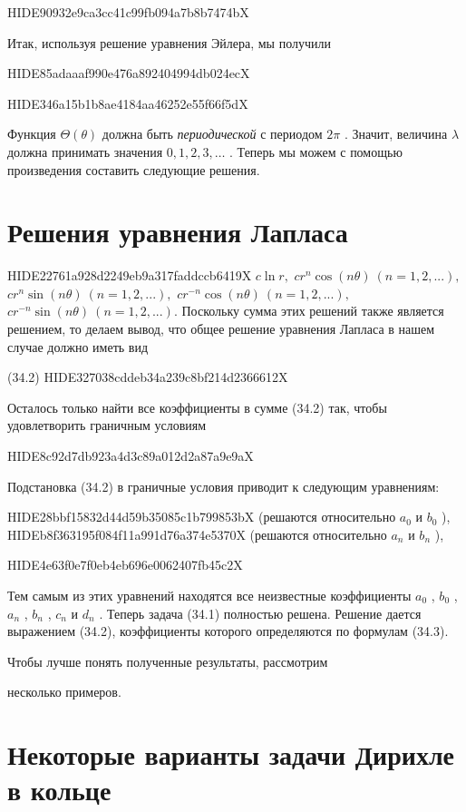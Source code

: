 \documentclass[
  ukrainian,
]{article}
\begin{document}
HIDE90932e9ca3cc41c99fb094a7b8b7474bX

Итак, используя решение уравнения Эйлера, мы получили

HIDE85adaaaf990e476a892404994db024ecX

HIDE346a15b1b8ae4184aa46252e55f66f5dX

Функция \(\Theta(\theta)\) должна быть \emph{периодической} с периодом
\(2\pi\) . Значит, величина \(\lambda\) должна принимать значения
\(0, 1, 2, 3, \ldots\) . Теперь мы можем с помощью произведения
составить следующие решения.

\section{Решения уравнения
Лапласа}\label{ux440ux435ux448ux435ux43dux438ux44f-ux443ux440ux430ux432ux43dux435ux43dux438ux44f-ux43bux430ux43fux43bux430ux441ux430}

HIDE22761a928d2249eb9a317faddccb6419X \(c \ln r,\)
\(cr^n \cos(n\theta) \ (n = 1, 2, ...),\)
\(cr^n \sin(n\theta) \ (n = 1, 2, ...),\)
\(cr^{-n} \cos(n\theta) \ (n = 1, 2, ...),\)
\(cr^{-n} \sin(n\theta) \ (n = 1, 2, ...).\) Поскольку сумма этих
решений также является решением, то делаем вывод, что общее решение
уравнения Лапласа в нашем случае должно иметь вид

(34.2) HIDE327038cddeb34a239c8bf214d2366612X

Осталось только найти все коэффициенты в сумме (34.2) так, чтобы
удовлетворить граничным условиям

HIDE8c92d7db923a4d3c89a012d2a87a9e9aX

Подстановка (34.2) в граничные условия приводит к следующим уравнениям:

HIDE28bbf15832d44d59b35085c1b799853bX (решаются относительно \(a_0\) и
\(b_0\) ), HIDEb8f363195f084f11a991d76a374e5370X (решаются относительно
\(a_n\) и \(b_n\) ),

HIDE4e63f0e7f0eb4eb696e0062407fb45c2X

Тем самым из этих уравнений находятся все неизвестные коэффициенты
\(a_0\) , \(b_0\) , \(a_n\) , \(b_n\) , \(c_n\) и \(d_n\) . Теперь
задача (34.1) полностью решена. Решение дается выражением (34.2),
коэффициенты которого определяются по формулам (34.3).

Чтобы лучше понять полученные результаты, рассмотрим

несколько примеров.

\section{Некоторые варианты задачи Дирихле в
кольце}\label{ux43dux435ux43aux43eux442ux43eux440ux44bux435-ux432ux430ux440ux438ux430ux43dux442ux44b-ux437ux430ux434ux430ux447ux438-ux434ux438ux440ux438ux445ux43bux435-ux432-ux43aux43eux43bux44cux446ux435}
\end{document}
